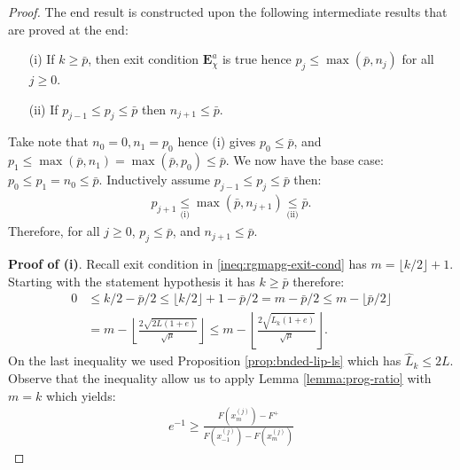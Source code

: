 \documentclass[12pt]{report}
\begin{document}
        \begin{proof}
            The end result is constructed upon the following intermediate results that are proved at the end: 
            \begin{enumerate}
                \item [(i)] If $k \ge \bar p$, then exit condition $\mathbf E_{\chi}^a$ is true hence $p_j \le \max(\bar p, n_j)$ for all $j \ge 0$. 
                \item [(ii)] If $p_{j - 1} \le p_j\le \bar p$  then $n_{j + 1} \le \bar p$. 
            \end{enumerate}
            Take note that $n_0 = 0, n_1 = p_0$ hence (i) gives $p_0 \le \bar p$, and $p_1 \le \max(\bar p, n_1) = \max(\bar p, p_0) \le \bar p$. 
            We now have the base case: $p_0 \le p_1 = n_0 \le \bar p$. 
            Inductively assume $p_{j - 1} \le p_j \le \bar p$ then: 
            \begin{align*}
                p_{j + 1} \underset{\text{(i)}}{\le} \max(\bar p, n_{j + 1}) \underset{\text{(ii)}}{\le} \bar p. 
            \end{align*}
            Therefore, for all $j \ge 0$, $p_j \le \bar p$, and $n_{j + 1} \le \bar p$. 
            \par
            \textbf{Proof of (i)}. 
            Recall exit condition in \eqref{ineq:rgmapg-exit-cond} has $m = \lfloor k/2\rfloor + 1$. 
            Starting with the statement hypothesis it has $k \ge \bar p$ therefore: 
            \begin{align*}
                0 &\le k/2 - \bar p/2 \le \lfloor k/2\rfloor + 1 - \bar p/2
                = m - \bar p /2 \le m - \lfloor \bar p/2\rfloor
                \\
                &= m - \left\lfloor 
                    \frac{2\sqrt{2L(1 + e)}}{\sqrt{\mu}}
                \right\rfloor \le 
                m - \left\lfloor 
                    \frac{2\sqrt{\widehat L_k(1 + e)}}{\sqrt{\mu}}
                \right\rfloor. 
            \end{align*}
            On the last inequality we used Proposition \ref{prop:bnded-lip-ls} which has $\widehat L_k \le 2 L$. 
            Observe that the inequality allow us to apply Lemma \ref{lemma:prog-ratio} with $m = k$ which yields: 
            \begin{align*}
                e^{-1} \ge 
                \frac{
                    F\left(x_{m}^{(j)}\right) - F^+
                }{
                    F\left(x_{-1}^{(j)}\right) 
                    - F\left(x_{m}^{(j)}\right)
}
\end{align*}
\end{proof}
\end{document}
